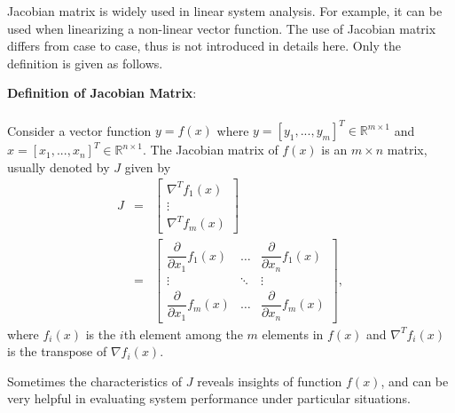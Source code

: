 Jacobian matrix is widely used in linear system analysis. For example, it can be used when linearizing a non-linear vector function. The use of Jacobian matrix differs from case to case, thus is not introduced in details here. Only the definition is given as follows.

\begin{mdframed}
	\textbf{Definition of Jacobian Matrix}:
	\\
	\\
    Consider a vector function $y=f(x)$ where $y = \left[y_1,...,y_m\right]^T \in \mathbb{R}^{m \times 1}$ and $x = [x_1,...,x_n]^T \in \mathbb{R}^{n \times 1}$. The Jacobian matrix of $f(x)$ is an $m \times n$ matrix, usually denoted by $J$ given by
	\begin{eqnarray}
	  J &=& \left[\begin{array}{c}
	                \nabla^T f_1(x) \\
	                \vdots \\
	                \nabla^T f_m(x)
	              \end{array}\right] \nonumber \\
        &=& \left[\begin{array}{ccc}
                    \dfrac{\partial}{\partial x_1}f_1(x) & \ldots & \dfrac{\partial}{\partial x_n}f_1(x) \\
                    \vdots & \ddots & \vdots \\
                    \dfrac{\partial}{\partial x_1}f_m(x) & \ldots & \dfrac{\partial}{\partial x_n}f_m(x)
                  \end{array}\right], \nonumber
	\end{eqnarray}
where $f_i(x)$ is the $i$th element among the $m$ elements in $f(x)$ and $\nabla^T f_i(x)$ is the transpose of $\nabla f_i(x)$.
\end{mdframed}

Sometimes the characteristics of $J$ reveals insights of function $f(x)$, and can be very helpful in evaluating system performance under particular situations.
